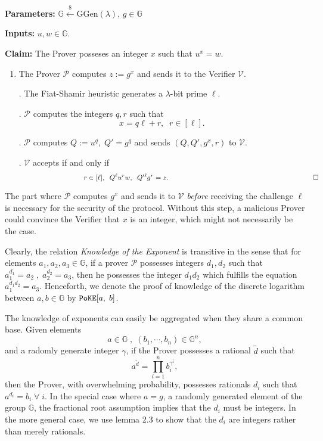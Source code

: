 \documentclass[11pt, lettersize, notitlepage, leqno, footskip=0.6cm]{article}
\newcommand{\pl}{\prod\limits}
\newcommand{\bG}{\mathbb{G}}
\newcommand{\wti}{\widetilde}
\newcommand{\mc}{\mathcal}
\newcommand{\mb}{\mathbb}
\newcommand{\mr}{\mathrm}
\newcommand{\lamb}{\lambda}
\newcommand{\mP}{\mc{P}}
\newcommand{\vs}{\vspace{-0.15cm}}
\numberwithin{equation}{section}
\begin{document}
\noindent \textbf{Parameters:} $\mb{G}\xleftarrow{\$} \mr{GGen}(\lamb)$,\; $g\in \mb{G}$

\noindent \textbf{Inputs:} $u, w \in \mb{G}$.

\noindent \textbf{Claim:} The Prover posseses an integer $x$ such that $u^x = w$. \vs

\begin{enumerate}[wide, labelwidth=!, labelindent=0pt]\vs \item The Prover $\mc{P}$ computes $z:= g^x$ and sends it to the Verifier $\mc{V}$.

. The Fiat-Shamir heuristic generates a $\lamb$-bit prime $\ell$.

. $\mc{P}$ computes the integers $q, r$ such that  \vspace{-0.15cm}$$x = q\ell+r,\;\; r\in [\ell].$$

. $\mc{P}$ computes $Q:= u^q,\; Q' = g^q$ and sends $(Q, Q', g^x, r)$ to $\mc{V}$.

. $\mc{V}$ accepts if and only if \vspace{-0.15cm}$$\;\;\;\;\;\;\;\;\;\;\;\;\;\;\;\;\;\;\;\;\;\;\;\;\;\;\;\;\;\;\;\;\;r\in [\ell],\;\; Q^{\ell}u^r w,\;\; Q'^{\ell}g^r = z. \;\;\;\;\;\;\;\;\;\;\;\;\;\;\;\;\;\;\;\;\;\;\;\;\;\;\;\;\;\;\;\;\;\;\;\;\;\;\;\;\;\;\;\;\;\;\;\;\;\;\;\;\;\;\;\;\;\;\;\;\;\;\;\;\;\;\;\qed$$ \end{enumerate}

The part where $\mc{P}$ computes $g^x$ and sends it to $\mc{V}$ \textit{before} receiving the challenge $\ell$ is necessary for the security of the protocol. Without this step, a malicious Prover could convince the Verifier that $x$ is an integer, which might not necessarily be the case.

Clearly, the relation \textit{Knowledge of the Exponent} is transitive in the sense that for elements $a_1,a_2,a_3\in\mb{G}$, if a prover $\mP$ possesses integers $d_1,d_2$ such that $a_1^{d_1} = a_2\;,\;a_2^{d_2} = a_3$, then he possesses the integer $d_1d_2$ which fulfills the equation $a_1^{d_1d_2} = a_3$. Henceforth, we denote the proof of knowledge of the discrete logarithm between $a,b\in\mb{G}$ by $\verb|PoKE|[a,\;b]$.

The knowledge of exponents can easily be aggregated when they share a common base. Given elements \vs $$a\in\mb{G}\;,\;(b_1,\cdots,b_n)\in\mb{G}^n, $$ and a radomly generate integer $\gamma$, if the Prover possesses a rational $\wti{d}$ such that \vs $$a^{\wti{d}} = \pl_{i=1}^n b_i^{\gamma^i},$$ then the Prover, with overwhelming probability, possesses rationals $d_i$ such that $a^{d_i} = b_i\;\forall\;i$. In the special case where $a = g$, a randomly generated element of the group $\bG$, the fractional root assumption implies that the $d_i$ must be integers. In the more general case, we use lemma 2.3 to show that the $d_i$ are integers rather than merely rationals.
\end{document}
